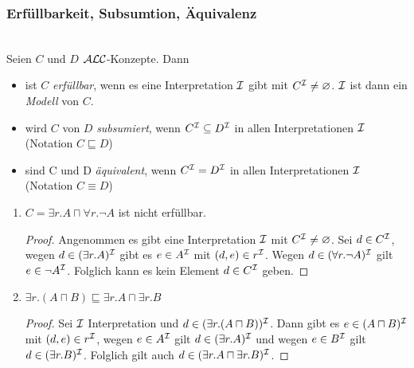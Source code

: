 \subsubsection{Erfüllbarkeit, Subsumtion, Äquivalenz}
\label{sec:erfull-subsum-equiv}
\label{erfuxfcllbarkeit-subsumtion-uxe4quivalenz}

\begin{definition}
    \mbox{}\\Seien $C$ und $D$ $\mathcal{A}\mathcal{L}\mathcal{C}$-Konzepte. Dann
\begin{itemize}
\item
  ist $C$ \emph{erfüllbar}, wenn es eine Interpretation $\mathcal{I}$ gibt mit
  $C^{\mathcal{I}} \neq \varnothing$. $\mathcal{I}$ ist dann ein \emph{Modell} von
  $C$.
\item
  wird $C$ von $D$ \emph{subsumiert}, wenn $C^{\mathcal{I}} \subseteq D^{\mathcal{I}}$
  in allen Interpretationen $\mathcal{I}$ (Notation $C \sqsubseteq D$)
\item
  sind C und D \emph{äquivalent}, wenn $C^{\mathcal{I}} = D^{\mathcal{I}}$ in allen
  Interpretationen $\mathcal{I}$ (Notation $C \equiv D$)
\end{itemize}
\end{definition}

\begin{tafel} \mbox{}
    \begin{enumerate}[label=\alph*)]
        \item $C = \exists r.A \sqcap \forall r.\neg A$ ist nicht erfüllbar.
            \begin{proof}
                Angenommen es gibt eine Interpretation $\mathcal{I}$ mit $C^{\mathcal{I}} \neq \varnothing$. Sei $d\in C^{\mathcal{I}}$, wegen $d \in (\exists r.A)^{\mathcal{I}}$ gibt es $e \in A^{\mathcal{I}}$ mit $(d, e) \in r^{\mathcal{I}}$. Wegen $d \in (\forall r.\neg A)^{\mathcal{I}}$ gilt $e\in \neg A^{\mathcal{I}}$. Folglich kann es kein Element $d \in C^{\mathcal{I}}$ geben.
            \end{proof}
        \item $\exists r.(A\sqcap B) \sqsubseteq  \exists r.A \sqcap \exists r.B$
            \begin{proof}
                Sei $\mathcal{I}$ Interpretation und $d \in (\exists r. (A\sqcap B))^{\mathcal{I}}$. Dann gibt es $e \in (A\sqcap B)^{\mathcal{I}}$ mit $(d, e) \in r^{\mathcal{I}}$, wegen $e \in A^{\mathcal{I}}$ gilt $d \in (\exists r.A)^{\mathcal{I}}$ und wegen $e \in B^{\mathcal{I}}$ gilt $d \in (\exists r.B)^{\mathcal{I}}$. Folglich gilt auch $d \in (\exists r.A \sqcap \exists r.B)^{\mathcal{I}}$.
            \end{proof}
    \end{enumerate}
\end{tafel}

